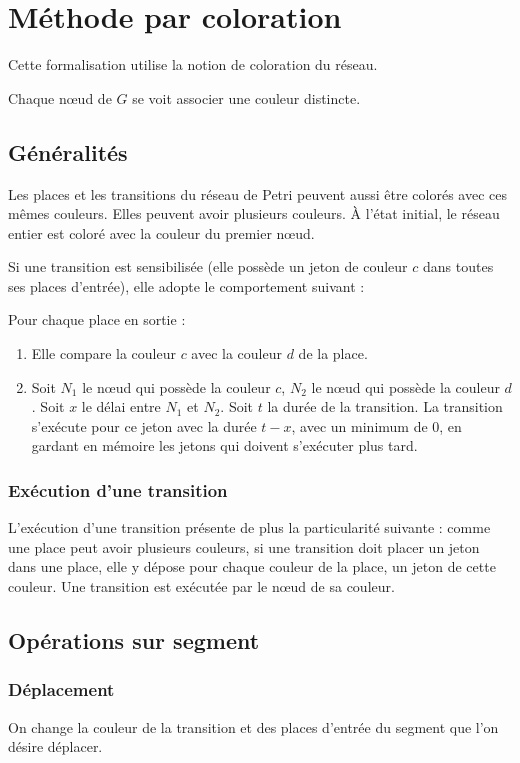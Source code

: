 \section{Méthode par coloration}
Cette formalisation utilise la notion de coloration du réseau.

Chaque nœud de $G$ se voit associer une couleur distincte.

\subsection{Généralités}
Les places et les transitions du réseau de Petri peuvent aussi être colorés avec ces mêmes couleurs. Elles peuvent avoir plusieurs couleurs.
À l'état initial, le réseau entier est coloré avec la couleur du premier nœud.

Si une transition est sensibilisée (elle possède un jeton de couleur $c$ dans toutes ses places d'entrée), elle adopte le comportement suivant : 

Pour chaque place en sortie :
\begin{enumerate}
\item Elle compare la couleur $c$ avec la couleur $d$ de la place. 
\item Soit $N_1$ le nœud qui possède la couleur $c$, $N_2$ le nœud qui possède la couleur $d$. Soit $x$ le délai entre $N_1$ et $N_2$. Soit $t$ la durée de la transition. La transition s'exécute pour ce jeton avec la durée $t - x$, avec un minimum de 0, en gardant en mémoire les jetons qui doivent s'exécuter plus tard.
\end{enumerate}

\subsubsection{Exécution d'une transition}
L'exécution d'une transition présente de plus la particularité suivante : comme une place peut avoir plusieurs couleurs, si une transition doit placer un jeton dans une place, elle y dépose pour chaque couleur de la place, un jeton de cette couleur. 
Une transition est exécutée par le nœud de sa couleur.

\subsection{Opérations sur segment}
\subsubsection{Déplacement}
On change la couleur de la transition et des places d'entrée du segment que l'on désire déplacer.

